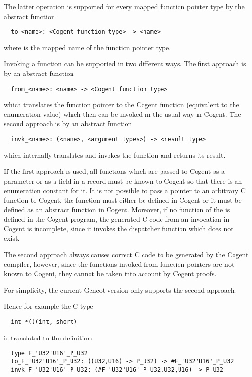 The latter operation is supported for every mapped function pointer type by the abstract function
\begin{verbatim}
  to_<name>: <Cogent function type> -> <name>
\end{verbatim}
where  is the mapped name of the function pointer type.

Invoking a function can be supported in two different ways. The first approach is by an abstract function
\begin{verbatim}
  from_<name>: <name> -> <Cogent function type>
\end{verbatim}
which translates the function pointer to the Cogent function (equivalent to the enumeration value) which
then can be invoked in the usual way in Cogent. The second approach is by an abstract function 
\begin{verbatim}
  invk_<name>: (<name>, <argument types>) -> <result type>
\end{verbatim}
which internally translates and invokes the function and returns its result.

If the first approach is used, all functions which are passed to Cogent as a parameter or as a field in a record must be known to
Cogent so that there is an enumeration constant for it. It is not possible to pass a pointer to an arbitrary 
C function to Cogent, the function must either be defined in Cogent or it must be defined as an abstract function 
in Cogent. Moreover, if no function of the  is defined in the Cogent program, the
generated C code from an invocation in Cogent is incomplete, since it invokes the dispatcher function which does
not exist.

The second approach always causes correct C code to be generated by the Cogent compiler, however, since the functions
invoked from function pointers are not known to Cogent, they cannot be taken into account by Cogent proofs.

For simplicity, the current Gencot version only supports the second approach.

Hence for example the C type
\begin{verbatim}
  int *()(int, short)
\end{verbatim}
is translated to the definitions
\begin{verbatim}
  type F_'U32'U16'_P_U32
  to_F_'U32'U16'_P_U32: ((U32,U16) -> P_U32) -> #F_'U32'U16'_P_U32
  invk_F_'U32'U16'_P_U32: (#F_'U32'U16'_P_U32,U32,U16) -> P_U32
\end{verbatim}

